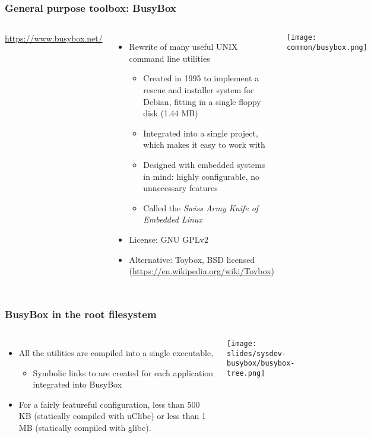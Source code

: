 \begin{frame}
  \frametitle{General purpose toolbox: BusyBox}
  \begin{columns}
      \url{https://www.busybox.net/}
      \begin{itemize}
      \item Rewrite of many useful UNIX command line utilities
        \begin{itemize}
        \item Created in 1995 to implement a rescue and installer
         system for Debian, fitting in a single floppy disk (1.44 MB)
        \item Integrated into a single project, which makes it easy to
          work with
        \item Designed with embedded systems in mind: highly configurable,
          no unnecessary features
        \item Called the {\em Swiss Army Knife of Embedded Linux}
        \end{itemize}
      \item License: GNU GPLv2
      \item Alternative: Toybox, BSD licensed (\url{https://en.wikipedia.org/wiki/Toybox})
      \end{itemize}
    \texttt{[image: common/busybox.png]}
  \end{columns}
\end{frame}

\begin{frame}
  \frametitle{BusyBox in the root filesystem}
  \begin{columns}
      \begin{itemize}
      \item All the utilities are compiled into a single executable,
        \begin{itemize}
        \item Symbolic links to  are created for each
          application integrated into BusyBox
        \end{itemize}
      \item For a fairly featureful configuration, less than 500 KB
        (statically compiled with uClibc) or less than 1 MB (statically
        compiled with glibc).
      \end{itemize}
      \texttt{[image: slides/sysdev-busybox/busybox-tree.png]}
  \end{columns}
\end{frame}

